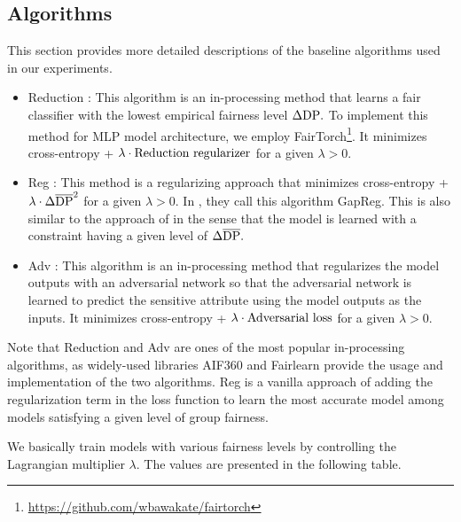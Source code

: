 \documentclass[10pt]{article} %
\begin{document}
\subsection{Algorithms}\label{sec:algorithms-appendix}

This section provides more detailed descriptions of the baseline algorithms used in our experiments.

\begin{itemize}
    \item Reduction \citep{pmlr-v80-agarwal18a}:
    This algorithm is an in-processing method that learns a fair classifier with the lowest empirical fairness level $\Delta \textup{DP}.$
    To implement this method for MLP model architecture, we employ FairTorch\footnote{\url{https://github.com/wbawakate/fairtorch}}.
    It minimizes cross-entropy + $\lambda \cdot \textup{Reduction regularizer}$ for a given $\lambda > 0.$
    
    \item Reg \citep{donini2018empirical, chuang2021fair}:
    This method is a regularizing approach that minimizes cross-entropy + $\lambda \cdot \Delta \overline{\textup{DP}}^{2}$ for a given $\lambda > 0.$
    In \citet{chuang2021fair}, they call this algorithm GapReg.
    This is also similar to the approach of \citet{donini2018empirical} in the sense that the model is learned with a constraint having a given level of $\Delta \overline{\textup{DP}}.$

    \item Adv \citep{10.1145/3278721.3278779}:
    This algorithm is an in-processing method that regularizes the model outputs with an adversarial network so that the adversarial network is learned to predict the sensitive attribute using the model outputs as the inputs.
    It minimizes cross-entropy + $\lambda \cdot \textup{Adversarial loss}$ for a given $\lambda > 0.$
\end{itemize}

Note that Reduction and Adv are ones of the most popular in-processing algorithms, as widely-used libraries AIF360 \citep{aif360-oct-2018} and Fairlearn \citep{bird2020fairlearn} provide the usage and implementation of the two algorithms.
Reg is a vanilla approach of adding the regularization term in the loss function to learn the most accurate model among models satisfying a given level of group fairness.

We basically train models with various fairness levels by controlling the Lagrangian multiplier $\lambda.$
The values are presented in the following table.
\end{document}
